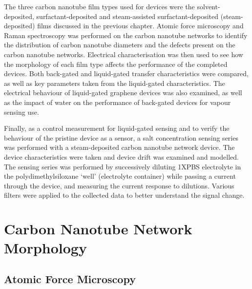\documentclass[
  a4paper,
]{scrbook}
\begin{document}
The three carbon nanotube film types used for devices were the
solvent-deposited, surfactant-deposited and steam-assisted
surfactant-deposited (steam-deposited) films discussed in the previous
chapter. Atomic force microscopy and Raman spectroscopy was performed on
the carbon nanotube networks to identify the distribution of carbon
nanotube diameters and the defects present on the carbon nanotube
networks. Electrical characterisation was then used to see how the
morphology of each film type affects the performance of the completed
devices. Both back-gated and liquid-gated transfer characteristics were
compared, as well as key parameters taken from the liquid-gated
characteristics. The electrical behaviour of liquid-gated graphene
devices was also examined, as well as the impact of water on the
performance of back-gated devices for vapour sensing use.

Finally, as a control measurement for liquid-gated sensing and to verify
the behaviour of the pristine device as a sensor, a salt concentration
sensing series was performed with a steam-deposited carbon nanotube
network device. The device characteristics were taken and device drift
was examined and modelled. The sensing series was performed by
successively diluting 1XPBS electrolyte in the polydimethylsiloxane
`well' (electrolyte container) while passing a current through the
device, and measuring the current response to dilutions. Various filters
were applied to the collected data to better understand the signal
change.

\hypertarget{sec-pristine-morphology}{%
\section{Carbon Nanotube Network
Morphology}\label{sec-pristine-morphology}}

\hypertarget{atomic-force-microscopy}{%
\subsection{Atomic Force Microscopy}\label{atomic-force-microscopy}}
\end{document}
